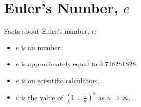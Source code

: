 \section{Euler's Number, $e$}

Facts about Euler's number, $e$:\par
\begin{minipage}{0.49\textwidth}
\begin{itemize}[nosep]
    \item $e$ is an  number.
    \item $e$ is approximately equal to 2.718281828.
\end{itemize}
\end{minipage}
\begin{minipage}{0.49\textwidth}
\begin{itemize}[nosep]
    \item $e$ is on scientific calculators.
    \item $e$ is the value of 
    \(    \left( 1 + \frac{1}{n}\right)^n    \)
    as 
    $n \rightarrow \infty$.
\end{itemize}
\end{minipage}


